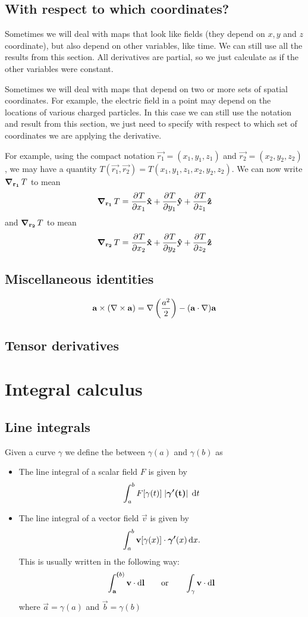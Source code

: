 \subsection{With respect to which coordinates?}
Sometimes we will deal with maps that look like fields (they depend on $x,y$ and $z$ coordinate), but also depend on other variables, like time. We can still use all the results from this section. All derivatives are partial, so we just calculate as if the other variables were constant.

Sometimes we will deal with maps that depend on two or more sets of spatial coordinates. For example, the electric field in a point may depend on the locations of various charged particles. In this case we can still use the notation and result from this section, we just need to specify with respect to which set of coordinates we are applying the derivative.

For example, using the compact notation $\vec{r_1} = (x_1,y_1,z_1)$ and $\vec{r_2} = (x_2,y_2,z_2)$, we may have a quantity $T(\vec{r_1}, \vec{r_2}) = T(x_1,y_1,z_1,x_2,y_2,z_2)$.
We can now write $\operatorname{\boldsymbol{\mathrm{\nabla}}}_{\boldsymbol{\mathrm{r_1}}}T$ to mean
\[ \operatorname{\boldsymbol{\mathrm{\nabla}}}_{\boldsymbol{\mathrm{r_1}}}T =   \frac{\partial{^{}}T}{\partial{{x_1}^{}}} \boldsymbol{\mathrm{\hat{x}}} +  \frac{\partial{^{}}T}{\partial{{y_1}^{}}} \boldsymbol{\mathrm{\hat{y}}} +  \frac{\partial{^{}}T}{\partial{{z_1}^{}}} \boldsymbol{\mathrm{\hat{z}}} \]
and $\operatorname{\boldsymbol{\mathrm{\nabla}}}_{\boldsymbol{\mathrm{r_2}}}T$ to mean
\[ \operatorname{\boldsymbol{\mathrm{\nabla}}}_{\boldsymbol{\mathrm{r_2}}}T =   \frac{\partial{^{}}T}{\partial{{x_2}^{}}} \boldsymbol{\mathrm{\hat{x}}} +  \frac{\partial{^{}}T}{\partial{{y_2}^{}}} \boldsymbol{\mathrm{\hat{y}}} +  \frac{\partial{^{}}T}{\partial{{z_2}^{}}} \boldsymbol{\mathrm{\hat{z}}} \]

\subsection{Miscellaneous identities}
\[ \boldsymbol{\mathrm{a}}\times (\mathop{}\! \nabla\times \boldsymbol{\mathrm{a}}) = \mathop{}\! \nabla \left(\frac{a^2}{2}\right) - (\boldsymbol{\mathrm{a}}\cdot \nabla)\boldsymbol{\mathrm{a}} \]

\subsection{Tensor derivatives}

\section{Integral calculus}
\subsection{Line integrals}
Given a curve $\gamma$ we define the  between $\gamma(a)$ and $\gamma(b)$ as

\begin{definition}
\begin{itemize}
\item The line integral of a scalar field $F$ is given by
\[ \int_a^b F[\gamma(t)]\;|\boldsymbol{\mathrm{\gamma'(t)}}|\; \operatorname{d \!}{t}  \]
\item The line integral of a vector field $\vec{v}$ is given by
\[ \int_a^b \boldsymbol{\mathrm{v}}[\gamma(x)]\cdot \boldsymbol{\mathrm{\gamma'}}(x) \operatorname{d \!}{x}. \]
This is usually written in the following way:
\[ \int_{\boldsymbol{\mathrm{a}}}^{\boldsymbol{\mathrm{(}}b)} \boldsymbol{\mathrm{v}}\cdot \operatorname{d \!}{\boldsymbol{\mathrm{l}}} \qquad \text{or} \qquad \int_\gamma \boldsymbol{\mathrm{v}}\cdot \operatorname{d \!}{\boldsymbol{\mathrm{l}}} \]
where $\vec{a} = \gamma(a)$ and $\vec{b} = \gamma(b)$
\end{itemize}
\end{definition}

